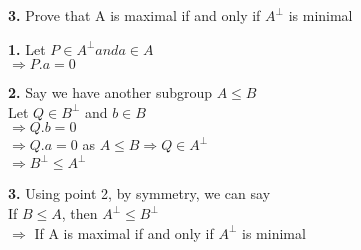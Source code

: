 \documentclass [12pt]{article}
\theoremstyle{definition}
\begin{document}
{\bf 3.} Prove that A is maximal if and only if $A^{\perp}$ is minimal

\phantom{1em} {\bf 1.} Let $P \in A^{\perp} and a \in A$\\
\phantom{1000em} $\Rightarrow P . a = 0$

\phantom{1em} {\bf 2.} Say we have another subgroup $A \leq B$\\
\phantom{1000em} Let $Q \in B^{\perp}$ and $b \in B$\\
\phantom{1000em} $\Rightarrow Q . b = 0$\\
\phantom{1000em} $\Rightarrow Q . a = 0$ as $A \leq B \Rightarrow Q \in A^{\perp}$\\
\phantom{1000em} $\Rightarrow B^{\perp} \leq A^{\perp}$

\phantom{1em} {\bf 3.} Using point 2, by symmetry, we can say\\
\phantom{1000em} If $B \leq A$, then $A^{\perp} \leq B^{\perp}$\\
\phantom{1000em} $\Rightarrow$ If A is maximal if and only if $A^{\perp}$ is minimal 
\end{document}
